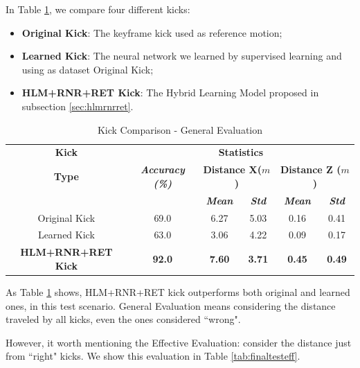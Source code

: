In Table \ref{tab:finaltest}, we compare four different kicks:

\begin{itemize}
	\item \textbf{Original Kick}: The keyframe kick used as reference motion;
	\item \textbf{Learned Kick}: The neural network we learned by supervised learning and using as dataset Original Kick;
	\item \textbf{HLM+RNR+RET Kick}: The Hybrid Learning Model proposed in subsection \ref{sec:hlmrnrret}.
\end{itemize}

\begin{table}[!htbp]
	\caption{Kick Comparison - General Evaluation}
	\begin{center} 
		\begin{tabular}{|c|c|c|c|c|c|}
			\hline
			\textbf{Kick}&\multicolumn{5}{|c|}{\textbf{Statistics}} \\
			\cline{2-6} 
			\textbf{Type} & \textbf{\textit{Accuracy (\%)}}& \multicolumn{2}{|c|}{\textbf{Distance X(\(m\))}}& 
			\multicolumn{2}{|c|}{\textbf{Distance Z (\(m\))}}\\
			\cline {3-6} 
			& & \textbf{\textit{Mean}}& \textbf{\textit{Std}}
			& \textbf{\textit{Mean}}& \textbf{\textit{Std}}\\
			\hline
			Original Kick & 69.0 & 6.27 & 5.03 & 0.16 & 0.41 \\
			\hline
			Learned Kick & 63.0 & 3.06 & 4.22 & 0.09 & 0.17 \\
			\hline
			\textbf{HLM+RNR+RET Kick}  & \textbf{92.0} & \textbf{7.60} & \textbf{3.71} & \textbf{0.45} & \textbf{0.49}  \\
			\hline
		\end{tabular}
		\label{tab:finaltest}
	\end{center}
\end{table}

As Table \ref{tab:finaltest} shows, HLM+RNR+RET kick outperforms both original and learned ones, in this test scenario. General Evaluation means considering the distance traveled by all kicks, even the ones considered ``wrong".

However, it worth mentioning the Effective Evaluation: consider the distance just from ``right" kicks. We show this evaluation in Table \ref{tab:finaltesteff}.


